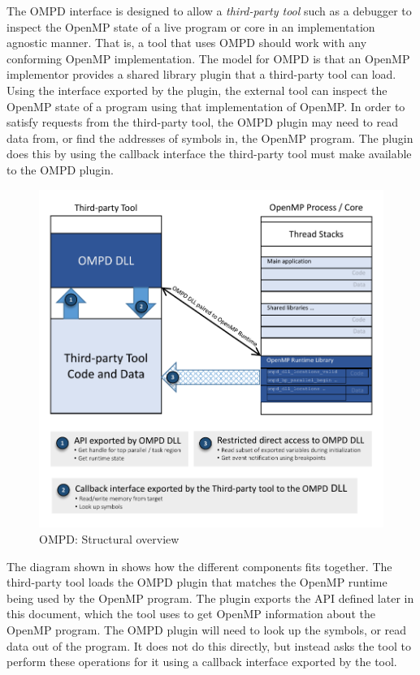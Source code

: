 \label{sec:ompd:ompd-overview}

The OMPD interface is designed to allow a \emph{third-party tool}
such as a debugger to inspect the OpenMP state of a live program
or core in an implementation agnostic manner.
That is, a tool that uses OMPD should work with any conforming
OpenMP implementation.
The model for OMPD is that an OpenMP implementor provides a shared
library plugin that a third-party tool can load.
Using the interface exported by the plugin, the external tool can
inspect the OpenMP state of a program using that implementation of OpenMP.
In order to satisfy requests from the third-party tool, the OMPD plugin
may need to read data from, or find the addresses of symbols in,
the OpenMP program.
The plugin does this by using the callback interface the third-party
tool must make available to the OMPD plugin.

\begin{figure}
  \centering
    \includegraphics[width=5.0in,natwidth=424.8,natheight=417.6]{figures/ompd-structural-overview.pdf}
  \caption{OMPD: Structural overview}
\label{fig:ompd:structural-overview}
\end{figure}


The diagram shown in   shows how the different
components fits together.
The third-party tool loads the OMPD plugin that matches the OpenMP runtime
being used by the OpenMP program.
The plugin exports the API defined later in this document,
which the tool uses to get OpenMP information about the OpenMP program.
The OMPD plugin will need to look up the symbols,
or read data out of the program.
It does not do this directly, but instead asks the tool to perform
these operations for it using a callback interface exported by the tool.

